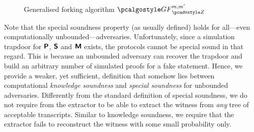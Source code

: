 	\begin{figure}[t]
		\centering
\caption{Generalised forking algorithm $\genforking_{\zdv}^{m, m'}$
  }
	\label{fig:genforking_lemma}
\end{figure}


\fi



\iffalse
Note that the special soundness property (as usually defined) holds for
all---even computationally unbounded---adversaries. Unfortunately, since a
simulation trapdoor for $\bm{\mathsf{P}}$, $\bm{\mathsf{S}}$ and $\bm{\mathsf{M}}$ exists, the protocols
cannot be special sound in that regard. This is because an unbounded adversary
can recover the trapdoor and build an arbitrary number of simulated proofs for a fake
statement. Hence, we provide a weaker, yet sufficient, definition that somehow lies between 
computational \emph{knowledge soundness} and \emph{special soundness} for unbounded adversaries. Differently from the standard definition of special soundness, we do not require from the extractor to be able to extract the witness from \emph{any} tree of acceptable transcripts. Similar to knowledge soundness, we require that the extractor fails to reconstruct the witness with some small probability only. 

